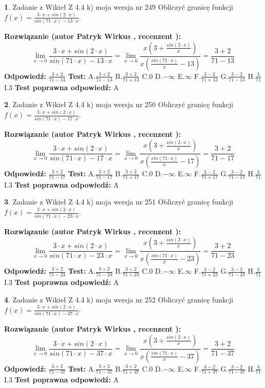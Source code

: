 \documentclass[12pt, a4paper]{article}
\theoremstyle{definition} %
\newtheorem{zad}{}
\newcommand{\zadStart}[1]{\begin{zad}#1\newline}
\newcommand{\zadStop}{\end{zad}}
\newcommand{\rozwStart}[2]{\noindent \textbf{Rozwiązanie (autor #1 , recenzent #2): }\newline}
\newcommand{\rozwStop}{\newline}
\newcommand{\odpStart}{\noindent \textbf{Odpowiedź:}\newline}
\newcommand{\odpStop}{\newline}
\newcommand{\testStart}{\noindent \textbf{Test:}\newline}
\newcommand{\testStop}{\newline}
\newcommand{\kluczStart}{\noindent \textbf{Test poprawna odpowiedź:}\newline}
\newcommand{\kluczStop}{\newline}
\begin{document}
\zadStart{Zadanie z Wikieł Z 4.4 k) moja wersja nr 249}
Obliczyć granicę funkcji $f(x)=\frac{3\cdot x +sin(2\cdot x)}{sin(71\cdot x) -13\cdot x}$.
\zadStop
\rozwStart{Patryk Wirkus}{}
$$\lim\limits_{x\to 0}\frac{3\cdot x +sin(2\cdot x)}{sin(71\cdot x) -13\cdot x}
=\lim\limits_{x\to 0}\frac{x(3+\frac{sin(2\cdot x)}{x})}{x(\frac{sin(71\cdot x)}{x}-13)}
=\frac{3+2}{71-13}$$
\rozwStop
\odpStart
$\frac{3+2}{71-13}$
\odpStop
\testStart
A.$\frac{3+2}{71-13}$
B.$\frac{3+2}{71+13}$
C.$0$
D.$-\infty$
E.$\infty$
F.$\frac{3-2}{71+13}$
G.$\frac{3-2}{71-13}$
H.$\frac{3}{71}$
I.$3$
\testStop
\kluczStart
A
\kluczStop



\zadStart{Zadanie z Wikieł Z 4.4 k) moja wersja nr 250}
Obliczyć granicę funkcji $f(x)=\frac{3\cdot x +sin(2\cdot x)}{sin(71\cdot x) -17\cdot x}$.
\zadStop
\rozwStart{Patryk Wirkus}{}
$$\lim\limits_{x\to 0}\frac{3\cdot x +sin(2\cdot x)}{sin(71\cdot x) -17\cdot x}
=\lim\limits_{x\to 0}\frac{x(3+\frac{sin(2\cdot x)}{x})}{x(\frac{sin(71\cdot x)}{x}-17)}
=\frac{3+2}{71-17}$$
\rozwStop
\odpStart
$\frac{3+2}{71-17}$
\odpStop
\testStart
A.$\frac{3+2}{71-17}$
B.$\frac{3+2}{71+17}$
C.$0$
D.$-\infty$
E.$\infty$
F.$\frac{3-2}{71+17}$
G.$\frac{3-2}{71-17}$
H.$\frac{3}{71}$
I.$3$
\testStop
\kluczStart
A
\kluczStop



\zadStart{Zadanie z Wikieł Z 4.4 k) moja wersja nr 251}
Obliczyć granicę funkcji $f(x)=\frac{3\cdot x +sin(2\cdot x)}{sin(71\cdot x) -23\cdot x}$.
\zadStop
\rozwStart{Patryk Wirkus}{}
$$\lim\limits_{x\to 0}\frac{3\cdot x +sin(2\cdot x)}{sin(71\cdot x) -23\cdot x}
=\lim\limits_{x\to 0}\frac{x(3+\frac{sin(2\cdot x)}{x})}{x(\frac{sin(71\cdot x)}{x}-23)}
=\frac{3+2}{71-23}$$
\rozwStop
\odpStart
$\frac{3+2}{71-23}$
\odpStop
\testStart
A.$\frac{3+2}{71-23}$
B.$\frac{3+2}{71+23}$
C.$0$
D.$-\infty$
E.$\infty$
F.$\frac{3-2}{71+23}$
G.$\frac{3-2}{71-23}$
H.$\frac{3}{71}$
I.$3$
\testStop
\kluczStart
A
\kluczStop



\zadStart{Zadanie z Wikieł Z 4.4 k) moja wersja nr 252}
Obliczyć granicę funkcji $f(x)=\frac{3\cdot x +sin(2\cdot x)}{sin(71\cdot x) -37\cdot x}$.
\zadStop
\rozwStart{Patryk Wirkus}{}
$$\lim\limits_{x\to 0}\frac{3\cdot x +sin(2\cdot x)}{sin(71\cdot x) -37\cdot x}
=\lim\limits_{x\to 0}\frac{x(3+\frac{sin(2\cdot x)}{x})}{x(\frac{sin(71\cdot x)}{x}-37)}
=\frac{3+2}{71-37}$$
\rozwStop
\odpStart
$\frac{3+2}{71-37}$
\odpStop
\testStart
A.$\frac{3+2}{71-37}$
B.$\frac{3+2}{71+37}$
C.$0$
D.$-\infty$
E.$\infty$
F.$\frac{3-2}{71+37}$
G.$\frac{3-2}{71-37}$
H.$\frac{3}{71}$
I.$3$
\testStop
\kluczStart
A
\kluczStop
\end{document}
